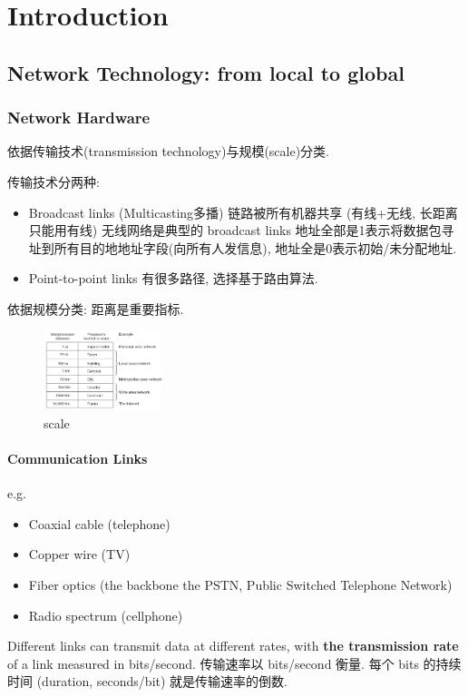 \newpage
\section{Introduction}
\subsection{Network Technology: from local to global}
\subsubsection{Network Hardware}
依据传输技术(transmission technology)与规模(scale)分类. 

传输技术分两种: 
\begin{itemize}
    \item Broadcast links (Multicasting多播)
    \subitem 链路被所有机器共享 (有线+无线, 长距离只能用有线)
    \subitem 无线网络是典型的 broadcast links
    \subitem 地址全部是1表示将数据包寻址到所有目的地地址字段(向所有人发信息), 地址全是0表示初始/未分配地址. 
    \item Point-to-point links
    \subitem 有很多路径, 选择基于路由算法. %
\end{itemize}

依据规模分类: 距离是重要指标. 
\begin{figure}[!htb]
    \centering
    \includegraphics[width=0.309\textwidth]{pic/CN1/scale}
    \caption{scale}
\end{figure}

\paragraph{Communication Links} e.g.
\begin{itemize}\small
    \item Coaxial cable (telephone)
    \item Copper wire (TV)
    \item Fiber optics (the backbone the PSTN, Public Switched Telephone Network)
    \item Radio spectrum (cellphone)
\end{itemize}

Different links can transmit data at different rates, with \textbf{the transmission rate} of a link measured in bits/second. 传输速率以 bits/second 衡量. 每个 bits 的持续时间 (duration, seconds/bit) 就是传输速率的倒数. 

